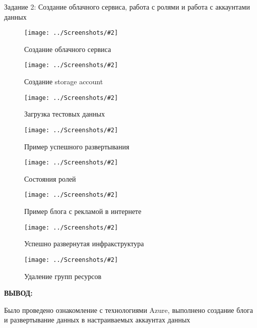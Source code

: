 \documentclass[14pt,a4paper]{extreport}
\newcommand{\screenshot}[2]{\begin{figure}[ht]%
\centering\texttt{[image: ../Screenshots/\#2]}%
\caption{#1}%
\label{picture#2}%
\end{figure}%
}
\newcommand{\header}[1]{%
{
\fontsize{16pt}{14pt}\selectfont
\begin{center}
\textbf{\MakeUppercase{#1}:}
\end{center}
}
}
\begin{document}
\clearpage
Задание 2: Создание облачного сервиса, работа с ролями и работа с аккаунтами данных

\screenshot{Создание облачного сервиса}{9}
\screenshot{Создание storage account}{10}
\screenshot{Загрузка тестовых данных}{11}
\screenshot{Пример успешного развертывания}{12}
\screenshot{Состояния ролей}{13}
\screenshot{Пример блога с рекламой в интернете}{14}
\screenshot{Успешно развернутая инфракструктура}{15}
\screenshot{Удаление групп ресурсов}{16}

\clearpage
\header{Вывод}

Было проведено ознакомление с технологиями Azure, выполнено создание блога и развертывание данных в настраиваемых аккаунтах данных
\end{document}
